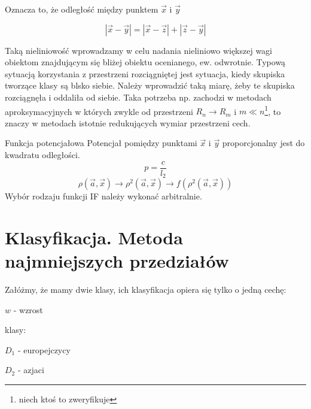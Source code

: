 \documentclass[a4paper,10pt]{article}
\begin{document}
Oznacza to, że odległość między punktem $\overrightarrow{x}$ i $\overrightarrow{y}$

\begin{equation}
|\overrightarrow{x} - \overrightarrow{y}| = |\overrightarrow{x} - \overrightarrow{z}| + |\overrightarrow{z} - \overrightarrow{y}|
\end{equation}

Taką nieliniowość wprowadzamy w celu nadania nieliniowo większej wagi obiektom znajdującym się bliżej obiektu ocenianego, ew. odwrotnie. Typową sytuacją korzystania z przestrzeni rozciągniętej jest sytuacja, kiedy skupiska tworzące klasy są blsko siebie. Należy wprowadzić taką miarę, żeby te skupiska rozciągnęła i oddaliła od siebie. Taka potrzeba np. zachodzi w metodach aproksymacyjnych w których zwykle od przestrzeni $R_n \rightarrow R_m$ i $m \ll n$\footnote{niech ktoś to zweryfikuje}, to znaczy w metodach istotnie redukujących wymiar przestrzeni cech.

Funkcja potencjałowa
Potencjał pomiędzy punktami $\overrightarrow{x}$ i $\overrightarrow{y}$ proporcjonalny jest do kwadratu odległości.
\begin{equation}
p = \frac{c}{l_2}
\end{equation}
\begin{equation}
\rho(\overrightarrow{a}, \overrightarrow{x}) \rightarrow \rho^2(\overrightarrow{a}, \overrightarrow{x}) \rightarrow f(\rho^2(\overrightarrow{a}, \overrightarrow{x}))
\end{equation}
Wybór rodzaju funkcji IF należy wykonać arbitralnie.

\section{Klasyfikacja. Metoda najmniejszych przedziałów}
Załóżmy, że mamy dwie klasy, ich klasyfikacja opiera się tylko o jedną cechę:

$w$ - wzrost

klasy:

$D_1$ - europejczycy

$D_2$ - azjaci
\end{document}
